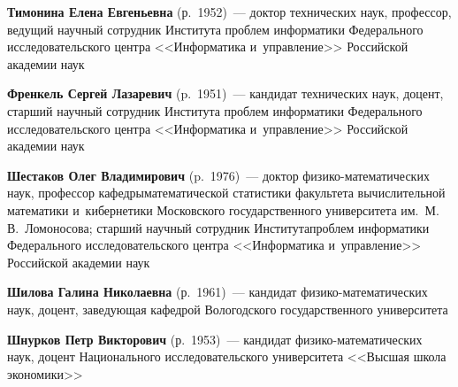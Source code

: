 \begin{multicols}{2}
\vspace*{3.5pt}

\noindent
\textbf{Тимонина Елена Евгеньевна} (р.\ 1952)~--- доктор технических наук, профессор, ведущий 
научный сотрудник Института проблем информатики Федерально\-го исследовательского центра 
<<Информатика и~управление>> Российской академии наук

\vspace*{3.5pt}

\noindent
\textbf{Френкель Сергей Лазаревич} (p.\ 1951)~--- кандидат технических наук, доцент, старший 
научный сотрудник Института проблем информатики Федерального исследовательского центра 
<<Информатика и~управление>> Российской академии наук

\vspace*{3.5pt}

\noindent
\textbf{Шестаков Олег Владимирович} (p.\ 1976)~--- доктор фи\-зи\-ко-ма\-те\-ма\-ти\-че\-ских 
наук, профессор кафедры\linebreak математической статистики факультета вычислительной математики 
и~кибернетики Московского государственного университета им.\ М.\,В.~Ломоносова; старший 
научный сотрудник Института\linebreak \mbox{проб\-лем} информатики Федерального исследовательского центра 
<<Информатика и~управ\-ле\-ние>> Российской академии наук

\vspace*{3.5pt}

\noindent
\textbf{Шилова Галина Николаевна} (р.\ 1961)~--- кандидат 
фи\-зи\-ко-ма\-те\-ма\-ти\-че\-ских наук, доцент, за\-ве\-ду\-ющая кафедрой Вологодского государственного 
университета

\vspace*{3.5pt}

\noindent
\textbf{Шнурков Петр Викторович} (р.\ 1953)~--- кандидат фи\-зи\-ко-ма\-те\-ма\-ти\-че\-ских 
наук, доцент Национального исследовательского университета <<Высшая школа экономики>>






\def\leftkol{ОБ АВТОРАХ}

\def\rightkol{ОБ АВТОРАХ}


 \label{end\stat}



\end{multicols}

\def\leftkol{ОБ АВТОРАХ}
\def\rightkol{ОБ АВТОРАХ}

\newpage